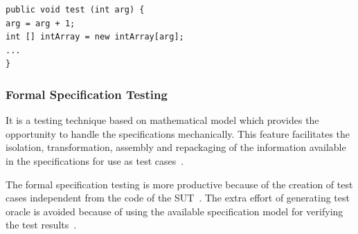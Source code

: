 \begin{lstlisting}
public void test (int arg) {
arg = arg + 1;
int [] intArray = new intArray[arg];
...
}
\end{lstlisting}



\subsubsection{Formal Specification Testing}
It is a testing technique based on mathematical model which provides the opportunity to handle the specifications mechanically. This feature facilitates the isolation, transformation, assembly and repackaging of the information available in the specifications for use as test cases~\cite{donat1997automating}.

The formal specification testing is more productive because of the creation of test cases independent from the code of the SUT~\cite{gaudel2010software}. The extra effort of generating test oracle is avoided because of using the available specification model for verifying the test results~\cite{bertolino2007software}.
  







